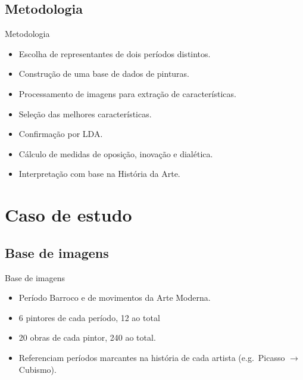 \documentclass{beamer}
\begin{document}
\subsection{Metodologia}
\begin{frame}{Metodologia}
\begin{itemize}
  \item Escolha de representantes de dois períodos distintos.
  \pause
  \item Construção de uma base de dados de pinturas.
  \pause
  \item Processamento de imagens para extração de características.
  \pause
  \item Seleção das melhores características.
  \pause
  \item Confirmação por LDA.
  \pause
  \item Cálculo de medidas de oposição, inovação e dialética.
  \pause
  \item Interpretação com base na História da Arte.
\end{itemize}

\end{frame}


\section{Caso de estudo}

\subsection{Base de imagens}
\begin{frame}{Base de imagens}
  \begin{itemize}
    \item Período Barroco e de movimentos da Arte Moderna.
    \item 6 pintores de cada período, 12 ao total
    \item 20 obras de cada pintor, 240 ao total.
    \item Referenciam períodos marcantes na história de cada artista (e.g.\ Picasso $\to$ Cubismo).
  \end{itemize}

\end{frame}
\end{document}
